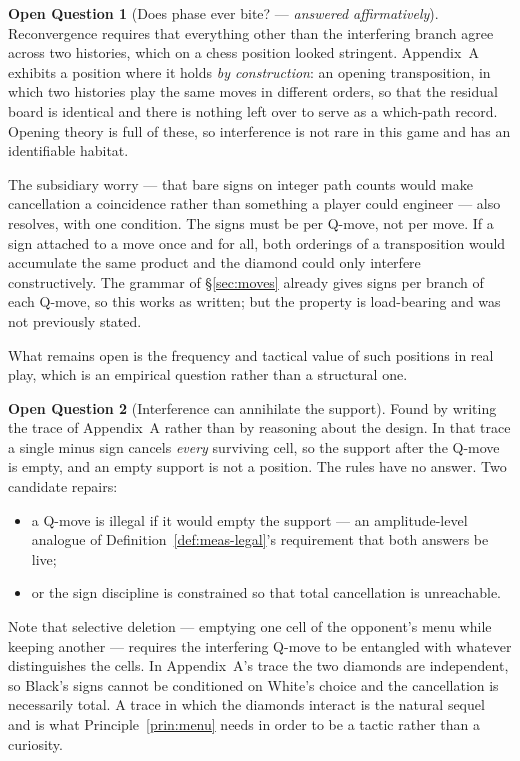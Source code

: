 \documentclass[11pt,a4paper]{article}
\theoremstyle{definition}
\newtheorem{question}{Open Question}
\theoremstyle{plain}
\begin{document}
\begin{question}[Does phase ever bite? --- \emph{answered affirmatively}]
\label{q:phase}
Reconvergence requires that everything other than the interfering branch agree
across two histories, which on a chess position looked stringent. Appendix~A
exhibits a position where it holds \emph{by construction}: an opening
transposition, in which two histories play the same moves in different orders,
so that the residual board is identical and there is nothing left over to serve
as a which-path record. Opening theory is full of these, so interference is not
rare in this game and has an identifiable habitat.

The subsidiary worry --- that bare signs on integer path counts would make
cancellation a coincidence rather than something a player could engineer ---
also resolves, with one condition. The signs must be per Q-move, not per move.
If a sign attached to a move once and for all, both orderings of a transposition
would accumulate the same product and the diamond could only interfere
constructively. The grammar of \S\ref{sec:moves} already gives signs per branch
of each Q-move, so this works as written; but the property is load-bearing and
was not previously stated.

What remains open is the frequency and tactical value of such positions in real
play, which is an empirical question rather than a structural one.
\end{question}

\begin{question}[Interference can annihilate the support]
\label{q:annihilate}
Found by writing the trace of Appendix~A rather than by reasoning about the
design. In that trace a single minus sign cancels \emph{every} surviving cell,
so the support after the Q-move is empty, and an empty support is not a
position. The rules have no answer. Two candidate repairs:
\begin{itemize}[leftmargin=1.4em]
\item a Q-move is illegal if it would empty the support --- an amplitude-level
      analogue of Definition~\ref{def:meas-legal}'s requirement that both
      answers be live;
\item or the sign discipline is constrained so that total cancellation is
      unreachable.
\end{itemize}
Note that selective deletion --- emptying one cell of the opponent's menu while
keeping another --- requires the interfering Q-move to be entangled with
whatever distinguishes the cells. In Appendix~A's trace the two diamonds are
independent, so Black's signs cannot be conditioned on White's choice and the
cancellation is necessarily total. A trace in which the diamonds interact is
the natural sequel and is what Principle~\ref{prin:menu} needs in order to be a
tactic rather than a curiosity.
\end{question}
\end{document}
